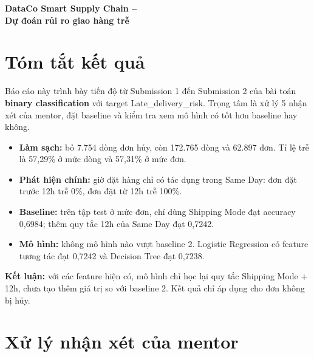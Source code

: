 \documentclass[11pt,a4paper]{article}
\newcommand{\note}[1]{\par\noindent\colorbox{notebg}{\parbox{\dimexpr\linewidth-2\fboxsep}{#1}}\par}
\newcommand{\col}[1]{\textsf{#1}}
\begin{document}
\hypersetup{pageanchor=false}
\begin{titlepage}
\centering
\vspace*{\fill}
{\Huge\bfseries DataCo Smart Supply Chain --\\[0.4cm] Dự đoán rủi ro giao hàng trễ\par}
\vspace*{\fill}
\end{titlepage}
\hypersetup{pageanchor=true}

\tableofcontents
\newpage

\section{Tóm tắt kết quả}

Báo cáo này trình bày tiến độ từ Submission 1 đến Submission 2 của bài toán \textbf{binary classification} với target \col{Late\_delivery\_risk}. Trọng tâm là xử lý 5 nhận xét của mentor, đặt baseline và kiểm tra xem mô hình có tốt hơn baseline hay không.

\begin{itemize}
  \item \textbf{Làm sạch:} bỏ 7.754 dòng đơn hủy, còn 172.765 dòng và 62.897 đơn. Tỉ lệ trễ là 57,29\% ở mức dòng và 57,31\% ở mức đơn.
  \item \textbf{Phát hiện chính:} giờ đặt hàng chỉ có tác dụng trong \col{Same Day}: đơn đặt trước 12h trễ 0\%, đơn đặt từ 12h trễ 100\%.
  \item \textbf{Baseline:} trên tập test ở mức đơn, chỉ dùng \col{Shipping Mode} đạt accuracy 0,6984; thêm quy tắc 12h của \col{Same Day} đạt 0,7242.
  \item \textbf{Mô hình:} không mô hình nào vượt baseline 2. Logistic Regression có feature tương tác đạt 0,7242 và Decision Tree đạt 0,7238.
\end{itemize}

\note{\textbf{Kết luận:} với các feature hiện có, mô hình chỉ học lại quy tắc \col{Shipping Mode} + 12h, chưa tạo thêm giá trị so với baseline 2. Kết quả chỉ áp dụng cho đơn không bị hủy.}

\section{Xử lý nhận xét của mentor}
\end{document}
